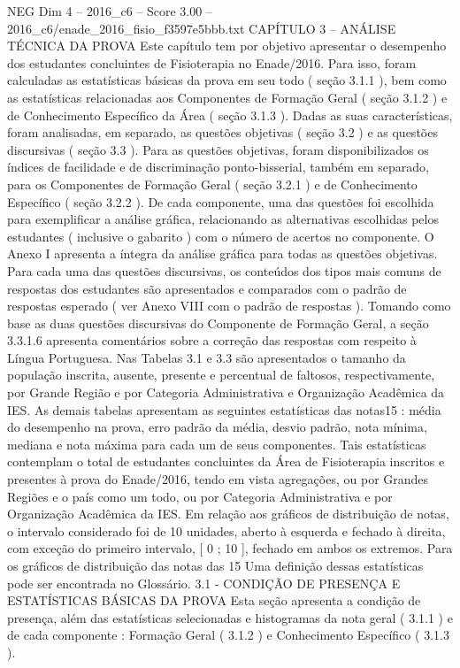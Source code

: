 \begin{textsample}{NEG Dim 4 – 2016\_c6 – Score 3.00 – 2016\_c6/enade\_2016\_fisio\_f3597e5bbb.txt}  \label{ex:f4_neg_300}
CAPÍTULO 3 – ANÁLISE TÉCNICA DA PROVA Este capítulo tem por objetivo apresentar o desempenho dos estudantes concluintes de Fisioterapia no Enade/2016.
Para isso, foram calculadas as estatísticas básicas da prova em seu todo ( seção 3.1.1 ), bem como as estatísticas relacionadas aos Componentes de Formação Geral ( seção 3.1.2 ) e de Conhecimento Específico da Área ( seção 3.1.3 ).
Dadas as suas características, foram analisadas, em separado, as questões objetivas ( seção 3.2 ) e as questões discursivas ( seção 3.3 ).
Para as questões objetivas, foram disponibilizados os índices de facilidade e de discriminação ponto-bisserial, também em separado, para os Componentes de Formação Geral ( seção 3.2.1 ) e de Conhecimento Específico ( seção 3.2.2 ).
De cada componente, uma das questões foi escolhida para exemplificar a análise gráfica, relacionando as alternativas escolhidas pelos estudantes ( inclusive o gabarito ) com o número de acertos no componente.
O Anexo I apresenta a íntegra da análise gráfica para todas as questões objetivas.
Para cada uma das questões discursivas, os conteúdos dos tipos mais comuns de respostas dos estudantes são apresentados e comparados com o padrão de respostas esperado ( ver Anexo VIII com o padrão de respostas ).
Tomando como base as duas questões discursivas do Componente de Formação Geral, a seção 3.3.1.6 apresenta comentários sobre a correção das respostas com respeito à Língua Portuguesa.
Nas Tabelas 3.1 e 3.3 são apresentados o tamanho da população inscrita, ausente, presente e percentual de faltosos, respectivamente, por Grande Região e por Categoria Administrativa e Organização Acadêmica da IES.
As demais tabelas apresentam as seguintes estatísticas das notas15 : média do desempenho na prova, erro padrão da média, desvio padrão, nota mínima, mediana e nota máxima para cada um de seus componentes.
Tais estatísticas contemplam o total de estudantes concluintes da Área de Fisioterapia inscritos e presentes à prova do Enade/2016, tendo em vista agregações, ou por Grandes Regiões e o país como um todo, ou por Categoria Administrativa e por Organização Acadêmica da IES.
Em relação aos gráficos de distribuição de notas, o intervalo considerado foi de 10 unidades, aberto à esquerda e fechado à direita, com exceção do primeiro intervalo, [ 0 ; 10 ], fechado em ambos os extremos.
Para os gráficos de distribuição das notas das 15 Uma definição dessas estatísticas pode ser encontrada no Glossário. 3.1 - CONDIÇÃO DE PRESENÇA E ESTATÍSTICAS BÁSICAS DA PROVA Esta seção apresenta a condição de presença, além das estatísticas selecionadas e histogramas da nota geral ( 3.1.1 ) e de cada componente : Formação Geral ( 3.1.2 ) e Conhecimento Específico ( 3.1.3 ).

\end{textsample}
